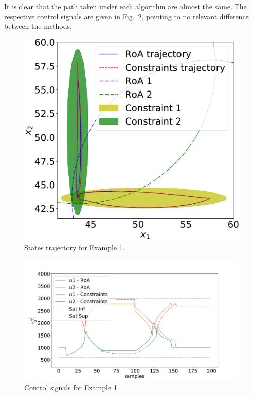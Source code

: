 It is clear that the path taken under each algorithm are almost the same. The
respective control signals are given in Fig.~\ref{fig:control-signals}, pointing
to no relevant difference between the methods.

\begin{figure}[ht!]
    \centering
    \captionsetup{justification=centering}
    \includegraphics[width=0.9\linewidth]{imgs/tanks-states}
    \caption{States trajectory for Example 1.}%
    \label{fig:states}
\end{figure}

\begin{figure}[ht!]
    \centering
    \captionsetup{justification=centering}
    \includegraphics[width=\linewidth]{imgs/tanks-control-signal}
    \caption{Control signals for Example 1.}%
    \label{fig:control-signals}
\end{figure}

